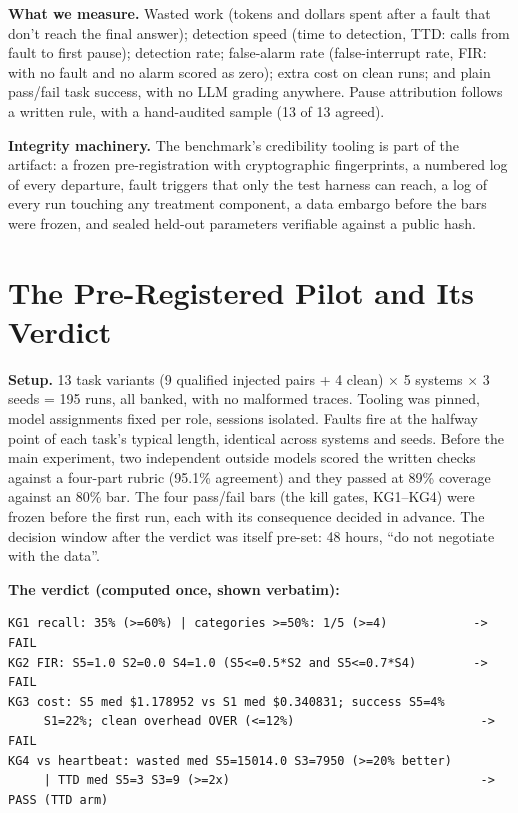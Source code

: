 \documentclass[acmsmall,screen]{acmart}
\begin{document}
\textbf{What we measure.} Wasted work (tokens and dollars spent after a fault
that don't reach the final answer); detection speed (time to detection, TTD:
calls from fault to first pause); detection rate; false-alarm rate (false-interrupt
rate, FIR: with no fault and no alarm scored as zero); extra cost on clean runs;
and plain pass/fail task success, with no LLM grading anywhere. Pause attribution follows a written rule, with a hand-audited
sample (13 of 13 agreed).

\textbf{Integrity machinery.} The benchmark's credibility tooling is part of
the artifact: a frozen pre-registration with cryptographic fingerprints, a
numbered log of every departure, fault triggers that only the test harness can
reach, a log of every run touching any treatment component, a data embargo
before the bars were frozen, and sealed held-out parameters verifiable against a
public hash.

\section{The Pre-Registered Pilot and Its Verdict}
\textbf{Setup.} 13 task variants (9 qualified injected pairs + 4 clean) $\times$
5 systems $\times$ 3 seeds = 195 runs, all banked, with no malformed traces.
Tooling was pinned, model assignments fixed per role, sessions isolated. Faults
fire at the halfway point of each task's typical length, identical across
systems and seeds. Before the main experiment, two independent outside models
scored the written checks against a four-part rubric (95.1\% agreement) and they
passed at 89\% coverage against an 80\% bar. The four pass/fail bars (the kill gates, KG1--KG4) were frozen
before the first run, each with its consequence decided in advance. The decision
window after the verdict was itself pre-set: 48 hours, ``do not negotiate with
the data''.

\textbf{The verdict (computed once, shown verbatim):}

\begin{lstlisting}
KG1 recall: 35% (>=60%) | categories >=50%: 1/5 (>=4)            -> FAIL
KG2 FIR: S5=1.0 S2=0.0 S4=1.0 (S5<=0.5*S2 and S5<=0.7*S4)        -> FAIL
KG3 cost: S5 med $1.178952 vs S1 med $0.340831; success S5=4%
     S1=22%; clean overhead OVER (<=12%)                          -> FAIL
KG4 vs heartbeat: wasted med S5=15014.0 S3=7950 (>=20% better)
     | TTD med S5=3 S3=9 (>=2x)                                   -> PASS (TTD arm)
\end{lstlisting}
\end{document}
